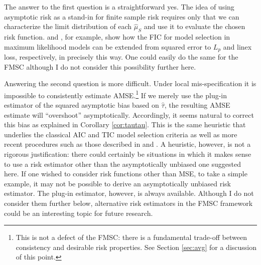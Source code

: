 The answer to the first question is a straightforward yes.
The idea of using asymptotic risk as a stand-in for finite sample risk requires only that we can characterize the limit distribution of each $\widehat{\mu}_S$ and use it to evaluate the chosen risk function.
\cite{Claeskens2006} and \cite{ClaeskensHjort2008}, for example, show how the FIC for model selection in maximum likelihood models can be extended from squared error to $L_p$ and linex loss, respectively, in precisely this way.
One could easily do the same for the FMSC although I do not consider this possibility further here.

Answering the second question is more difficult.
Under local mis-specification it is impossible to consistently estimate AMSE.\footnote{This is not a defect of the FMSC: there is a fundamental trade-off between consistency and desirable risk properties. See Section \ref{sec:avg} for a discussion of this point.}
If we merely use the plug-in estimator of the squared asymptotic bias based on $\widehat{\tau}$, the resulting AMSE estimate will ``overshoot'' asymptotically.
Accordingly, it seems natural to correct this bias as explained in Corollary \ref{cor:tautau}.
This is the same heuristic that underlies the classical AIC and TIC model selection criteria as well as more recent procedures such as those described in \cite{ClaeskensHjort2003} and \cite{Schorfheide2005}.
A heuristic, however, is not a rigorous justification: there could certainly be situations in which it makes sense to use a risk estimator other than the asymptotically unbiased one suggested here.
If one wished to consider risk functions other than MSE, to take a simple example, it may not be possible to derive an asymptotically unbiased risk estimator.
The plug-in estimator, however, is always available.
Although I do not consider them further below, alternative risk estimators in the FMSC framework could be an interesting topic for future research.
